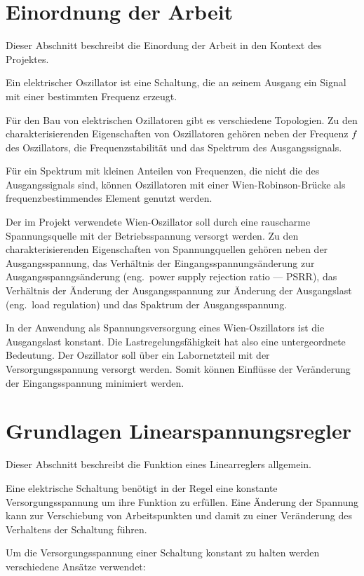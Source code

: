 \section{Einordnung der Arbeit}
Dieser Abschnitt beschreibt die Einordung der Arbeit in den Kontext des 
Projektes.

Ein elektrischer Oszillator ist eine Schaltung, die an seinem Ausgang ein
Signal mit einer bestimmten Frequenz erzeugt.

Für den Bau von elektrischen Ozillatoren gibt es verschiedene Topologien.
Zu den charakterisierenden Eigenschaften von Oszillatoren gehören neben
der Frequenz $f$ des Oszillators, die Frequenzstabilität und das Spektrum des 
Ausgangssignals.

Für ein Spektrum mit kleinen Anteilen von Frequenzen, die nicht die des 
Ausgangssignals sind, können Oszillatoren mit einer Wien-Robinson-Brücke als 
frequenzbestimmendes Element genutzt werden.

Der im Projekt verwendete Wien-Oszillator soll durch eine rauscharme 
Spannungsquelle mit der Betriebsspannung versorgt werden.
Zu den charakterisierenden Eigenschaften von Spannungquellen gehören neben der
Ausgangsspannung, das Verhältnis der Eingangsspannungsänderung zur 
Ausgangsspanngsänderung (eng.\ power supply rejection ratio — PSRR),
das Verhältnis der Änderung der Ausgangsspannung zur Änderung der Ausgangslast
(eng.\ load regulation) und das Spaktrum der Ausgangsspannung.

In der Anwendung als Spannungsversorgung eines Wien-Oszillators ist die 
Ausgangslast konstant. Die Lastregelungsfähigkeit hat also eine untergeordnete
Bedeutung. Der Oszillator soll über ein Labornetzteil mit der 
Versorgungsspannung versorgt werden. Somit können Einflüsse der 
Veränderung der Eingangsspannung minimiert werden. 

\section{Grundlagen Linearspannungsregler}
Dieser Abschnitt beschreibt die Funktion eines Linearreglers allgemein.

Eine elektrische Schaltung benötigt in der Regel eine konstante 
Versorgungsspannung um ihre Funktion zu erfüllen.
Eine Änderung der Spannung kann zur Verschiebung von Arbeitspunkten und damit
zu einer Veränderung des Verhaltens der Schaltung führen.

Um die Versorgungsspannung einer Schaltung konstant zu halten werden 
verschiedene Ansätze verwendet:

